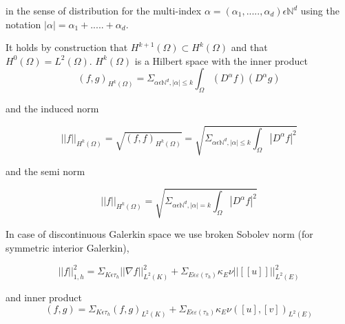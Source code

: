 \documentclass[a4paper,10pt]{book}
\begin{document}
in the sense of distribution for the multi-index $\alpha = (\alpha_1,.....,\alpha_d) \epsilon \mathbb{N}^d$ using the notation $|\alpha| = \alpha_1 + ..... + \alpha_d $.

It holds by construction that $H^{k+1}(\Omega) \subset H^k (\Omega)$ and that $H^0 (\Omega) = L^2 (\Omega)$. $H^k(\Omega)$ is a Hilbert space with the inner product
\begin{equation}
(f,g)_{H^k(\Omega)} = \Sigma_{\alpha \epsilon \mathbb{N}^d, |\alpha| \leq k} \int_\Omega (D^\alpha f) (D^\alpha g)
\end{equation}

and the induced norm 

\begin{equation}
||f||_{H^k (\Omega)} = \sqrt{(f,f)_{H^k(\Omega)}} = \sqrt{\Sigma_{\alpha \epsilon \mathbb{N}^d, |\alpha| \leq k} \int_\Omega |D^\alpha f|^2}
\end{equation}

and the semi norm 

\begin{equation}
||f||_{H^k (\Omega)} = \sqrt{\Sigma_{\alpha \epsilon \mathbb{N}^d, |\alpha| = k} \int_\Omega |D^\alpha f|^2}
\end{equation}

In case of discontinuous Galerkin space we use broken Sobolev norm (for symmetric interior Galerkin), \cite{Montlaur2}

\begin{equation}
||f||_{1,h}^2 = \Sigma_{K \epsilon \tau_h} ||\nabla f||_{L^2(K)}^2 + \Sigma_{E \epsilon \varepsilon(\tau_h)} \kappa_E \nu ||[[u]]||_{L^2 (E)}^2
\end{equation}

and inner product \\

\begin{equation}
(f,g) = \Sigma_{K \epsilon \tau_h} (f,g)_{L^2(K)} + \Sigma_{E \epsilon \varepsilon(\tau_h)} \kappa_E \nu ([u],[v])_{L^2 (E)}
\end{equation}


\newpage



\end{document}
